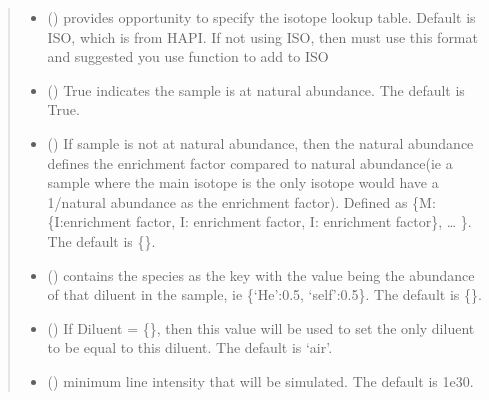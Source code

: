 \documentclass[letterpaper,10pt,english]{sphinxmanual}
\begin{document}
\begin{fulllineitems}
\begin{quote}
\begin{description}
\begin{itemize}
\item {} 
\sphinxAtStartPar
{} (\sphinxstyleliteralemphasis{\sphinxupquote{, }}) \textendash{} provides opportunity to specify the isotope look\sphinxhyphen{}up table.  Default is ISO, which is from HAPI.  If not using ISO, then must use this format and suggested you use function to add to ISO

\item {} 
\sphinxAtStartPar
{} (\sphinxstyleliteralemphasis{\sphinxupquote{, }}) \textendash{} True indicates the sample is at natural abundance. The default is True.

\item {} 
\sphinxAtStartPar
{} (\sphinxstyleliteralemphasis{\sphinxupquote{, }}) \textendash{} If sample is not at natural abundance, then the natural abundance defines the enrichment factor compared to natural abundance(ie a sample where the main isotope is the only isotope would have a 1/natural abundance as the enrichment factor). Defined as \{M:\{I:enrichment factor, I: enrichment factor, I: enrichment factor\}, … \}. The default is \{\}.

\item {} 
\sphinxAtStartPar
{} (\sphinxstyleliteralemphasis{\sphinxupquote{, }}) \textendash{} contains the species as the key with the value being the abundance of that diluent in the sample, ie \{‘He’:0.5, ‘self’:0.5\}. The default is \{\}.

\item {} 
\sphinxAtStartPar
{} (\sphinxstyleliteralemphasis{\sphinxupquote{, }}) \textendash{} If Diluent = \{\}, then this value will be used to set the only diluent to be equal to this diluent. The default is ‘air’.

\item {} 
\sphinxAtStartPar
{} (\sphinxstyleliteralemphasis{\sphinxupquote{, }}) \textendash{} minimum line intensity that will be simulated. The default is 1e\sphinxhyphen{}30.


\end{itemize}
\end{description}
\end{quote}
\end{fulllineitems}
\end{document}

